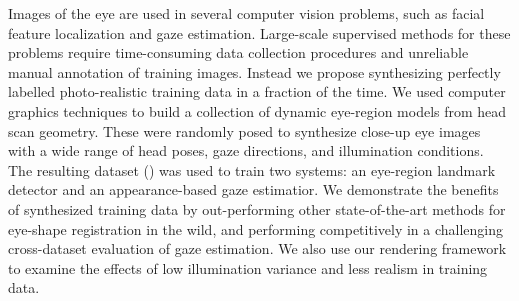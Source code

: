 Images of the eye are used in several computer vision problems, such as facial feature localization and gaze estimation.
Large-scale supervised methods for these problems require time-consuming data collection procedures and unreliable manual annotation of training images.
Instead we propose synthesizing perfectly labelled photo-realistic training data in a fraction of the time.
We used computer graphics techniques to build a collection of dynamic eye-region models from head scan geometry.
%
These were randomly posed to synthesize close-up eye images with a wide range of head poses, gaze directions, and illumination conditions.
%
The resulting dataset (\dataset) was used to train two systems: an eye-region landmark detector and an appearance-based gaze estimatior.
We demonstrate the benefits of synthesized training data by out-performing other state-of-the-art methods for eye-shape registration in the wild, and performing competitively in a challenging cross-dataset evaluation of gaze estimation.
We also use our rendering framework to examine the effects of low illumination variance and less realism in training data.
%